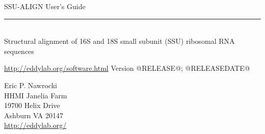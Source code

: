 \begin{titlepage}
{\Large

\vspace*{\fill}

\noindent
{\Huge \textsf{SSU-ALIGN User's Guide}} \\ 
\rule[2pt]{\textwidth}{1pt} \\
\hspace*{\fill} {\large \textsf{Structural alignment of 16S and 18S small subunit
    (SSU) ribosomal RNA sequences}\\}

\vspace*{\fill}

\begin{center}
\url{http://eddylab.org/software.html}
Version @RELEASE@; @RELEASEDATE@ \\ 

\vspace*{\fill}

Eric P. Nawrocki\\
HHMI Janelia Farm\\
19700 Helix Drive\\
Ashburn VA 20147\\
\url{http://eddylab.org/}
\end{center}

\vspace*{\fill}

}
\end{titlepage}
